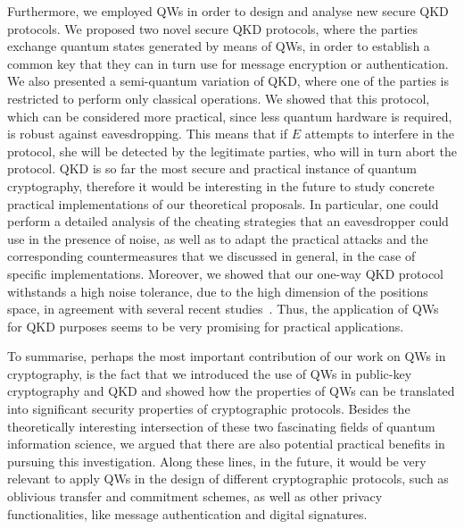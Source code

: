 Furthermore, we employed QWs in order to design and analyse new secure QKD protocols. We proposed two novel secure QKD protocols, where the parties exchange quantum states generated by means of QWs, in order to establish a common key that they can in turn use for message encryption or authentication. We also presented a semi-quantum variation of QKD, where one of the parties is restricted to perform only classical operations. We showed that this protocol, which can be considered more practical, since less quantum hardware is required, is robust against eavesdropping. This means that if $E$ attempts to interfere in the protocol, she will be detected by the legitimate parties, who will in turn abort the protocol. 
QKD is so far the most secure and practical instance of quantum cryptography, therefore it would be interesting in the future to study concrete practical implementations of our theoretical proposals. In particular, one could perform a detailed analysis of the cheating strategies that an eavesdropper could use in the presence of noise, as well as to adapt the practical attacks and the corresponding countermeasures that we discussed in general, in the case of specific implementations. Moreover, we showed that our one-way QKD protocol withstands a high noise tolerance, due to the high dimension of the positions space, in agreement with several recent studies~\cite{bec:tit:00,cer:bou:kar:gis:02,bru:chr:eke:eng:ber:kas:mac:03,nik:alb:05,she:sca:10,cha:15}. Thus, the application of QWs for QKD purposes seems to be very promising for practical applications.

To summarise, perhaps the most important contribution of our work on QWs in cryptography, is the fact that we introduced the use of QWs in public-key cryptography and QKD and showed how the properties of QWs can be translated into significant security properties of cryptographic protocols. Besides the theoretically interesting intersection of these two fascinating fields of quantum information science, we argued that there are also potential practical benefits in pursuing this investigation. Along these lines, in the future, it would be very relevant to apply QWs in the design of different cryptographic protocols, such as oblivious transfer and commitment schemes, as well as other privacy functionalities, like message authentication and digital signatures.

